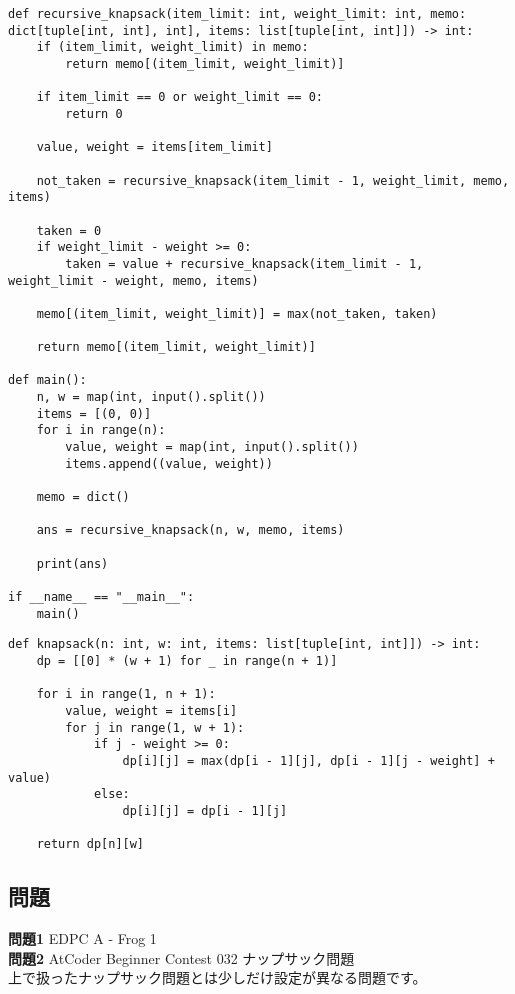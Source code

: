 \begin{lstlisting}[caption=メモ化再帰を用いたナップサック問題の実装, frame=TRBL, label={memo_knapsack}]
def recursive_knapsack(item_limit: int, weight_limit: int, memo: dict[tuple[int, int], int], items: list[tuple[int, int]]) -> int:
    if (item_limit, weight_limit) in memo:
        return memo[(item_limit, weight_limit)]
    
    if item_limit == 0 or weight_limit == 0:
        return 0
    
    value, weight = items[item_limit]
    
    not_taken = recursive_knapsack(item_limit - 1, weight_limit, memo, items)
    
    taken = 0
    if weight_limit - weight >= 0:
        taken = value + recursive_knapsack(item_limit - 1, weight_limit - weight, memo, items)
    
    memo[(item_limit, weight_limit)] = max(not_taken, taken)
    
    return memo[(item_limit, weight_limit)]

def main():
    n, w = map(int, input().split())
    items = [(0, 0)]  
    for i in range(n):
        value, weight = map(int, input().split())
        items.append((value, weight))
    
    memo = dict()
    
    ans = recursive_knapsack(n, w, memo, items)
    
    print(ans)

if __name__ == "__main__":
    main()
\end{lstlisting}

\begin{lstlisting}[caption=漸化式を用いたナップサック問題の実装, frame=TRBL, label={dp_knapsack}]
def knapsack(n: int, w: int, items: list[tuple[int, int]]) -> int:
    dp = [[0] * (w + 1) for _ in range(n + 1)]
    
    for i in range(1, n + 1):
        value, weight = items[i]
        for j in range(1, w + 1):
            if j - weight >= 0:
                dp[i][j] = max(dp[i - 1][j], dp[i - 1][j - weight] + value)
            else:
                dp[i][j] = dp[i - 1][j]
    
    return dp[n][w]
\end{lstlisting}

\subsection{問題}
\textbf{問題1} EDPC A - Frog 1\\
\textbf{問題2} AtCoder Beginner Contest 032 ナップサック問題\\  
上で扱ったナップサック問題とは少しだけ設定が異なる問題です。\\

